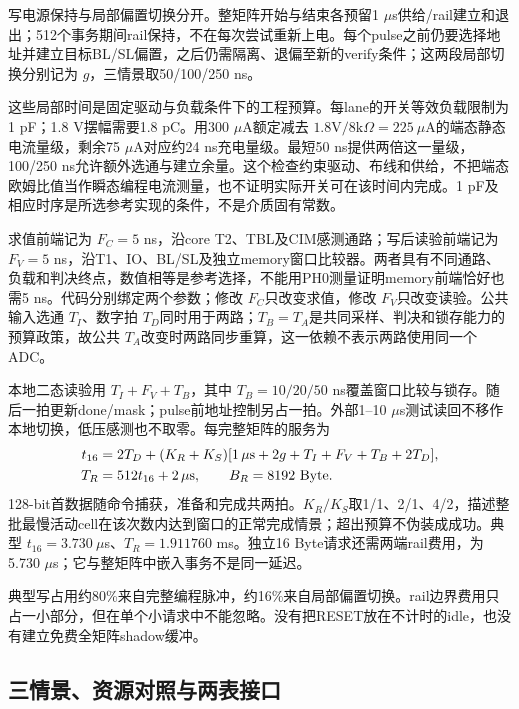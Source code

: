 写电源保持与局部偏置切换分开。整矩阵开始与结束各预留1 $\mu$s供给/rail建立和退出；512个事务期间rail保持，不在每次尝试重新上电。每个pulse之前仍要选择地址并建立目标BL/SL偏置，之后仍需隔离、退偏至新的verify条件；这两段局部切换分别记为 $g$，三情景取50/100/250 ns。

这些局部时间是固定驱动与负载条件下的工程预算。每lane的开关等效负载限制为1 pF；1.8 V摆幅需要1.8 pC。用300 $\mu$A额定减去 $1.8\mathrm{V}/8\mathrm{k}\Omega=225\ \mu$A的端态静态电流量级，剩余75 $\mu$A对应约24 ns充电量级。最短50 ns提供两倍这一量级，100/250 ns允许额外选通与建立余量。这个检查约束驱动、布线和供给，不把端态欧姆比值当作瞬态编程电流测量，也不证明实际开关可在该时间内完成。1 pF及相应时序是所选参考实现的条件，不是介质固有常数。

求值前端记为 $F_C=5$ ns，沿core T2、TBL及CIM感测通路；写后读验前端记为 $F_V=5$ ns，沿T1、IO、BL/SL及独立memory窗口比较器。两者具有不同通路、负载和判决终点，数值相等是参考选择，不能用PH0测量证明memory前端恰好也需5 ns。代码分别绑定两个参数；修改 $F_C$只改变求值，修改 $F_V$只改变读验。公共输入选通 $T_I$、数字拍 $T_D$同时用于两路；$T_B=T_A$是共同采样、判决和锁存能力的预算政策，故公共 $T_A$改变时两路同步重算，这一依赖不表示两路使用同一个ADC。

本地二态读验用 $T_I+F_V+T_B$，其中 $T_B=10/20/50$ ns覆盖窗口比较与锁存。随后一拍更新done/mask；pulse前地址控制另占一拍。外部1--10 $\mu$s测试读回不移作本地切换，低压感测也不取零。每完整矩阵的服务为
\begin{equation}
\begin{aligned}
t_{16}&=2T_D+(K_R+K_S)
 [1\,\mu\mathrm{s}+2g+T_I+F_V+T_B+2T_D],\\
T_R&=512t_{16}+2\,\mu\mathrm{s},\qquad B_R=8192\ \mathrm{Byte}.
\end{aligned}
\label{05_rram:eq:write}
\end{equation}
128-bit首数据随命令捕获，准备和完成共两拍。$K_R/K_S$取1/1、2/1、4/2，描述整批最慢活动cell在该次数内达到窗口的正常完成情景；超出预算不伪装成成功。典型 $t_{16}=3.730\ \mu$s、$T_R=1.911760$ ms。独立16 Byte请求还需两端rail费用，为5.730 $\mu$s；它与整矩阵中嵌入事务不是同一延迟。



典型写占用约80\%来自完整编程脉冲，约16\%来自局部偏置切换。rail边界费用只占一小部分，但在单个小请求中不能忽略。没有把RESET放在不计时的idle，也没有建立免费全矩阵shadow缓冲。

\subsection{三情景、资源对照与两表接口}

